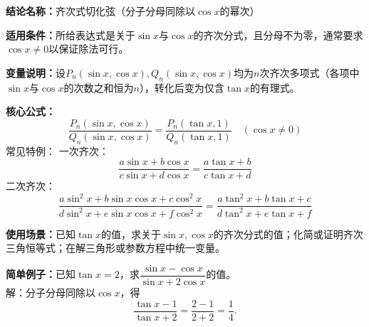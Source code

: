 \textbf{结论名称：}齐次式切化弦（分子分母同除以\(\cos x\)的幂次）

\textbf{适用条件：}所给表达式是关于\(\sin x\)与\(\cos x\)的齐次分式，且分母不为零，通常要求\(\cos x \neq 0\)以保证除法可行。

\textbf{变量说明：}设\(P_n(\sin x,\cos x), Q_n(\sin x,\cos x)\)均为\(n\)次齐次多项式（各项中\(\sin x\)与\(\cos x\)的次数之和恒为\(n\)），转化后变为仅含\(\tan x\)的有理式。

\textbf{核心公式：}
\[
\boxed{\frac{P_n(\sin x,\cos x)}{Q_n(\sin x,\cos x)} = \frac{P_n(\tan x,1)}{Q_n(\tan x,1)}\quad (\cos x \neq 0)}
\]
常见特例：
一次齐次：\[ \frac{a\sin x + b\cos x}{c\sin x + d\cos x} = \frac{a\tan x + b}{c\tan x + d} \]
二次齐次：\[ \frac{a\sin^2 x + b\sin x\cos x + c\cos^2 x}{d\sin^2 x + e\sin x\cos x + f\cos^2 x} = \frac{a\tan^2 x + b\tan x + c}{d\tan^2 x + e\tan x + f} \]

\textbf{使用场景：}已知\(\tan x\)的值，求关于\(\sin x,\cos x\)的齐次分式的值；化简或证明齐次三角恒等式；在解三角形或参数方程中统一变量。

\textbf{简单例子：}已知\(\tan x = 2\)，求\(\dfrac{\sin x - \cos x}{\sin x + 2\cos x}\)的值。\\
解：分子分母同除以\(\cos x\)，得
\[
\frac{\tan x - 1}{\tan x + 2} = \frac{2-1}{2+2} = \frac{1}{4}.
\]